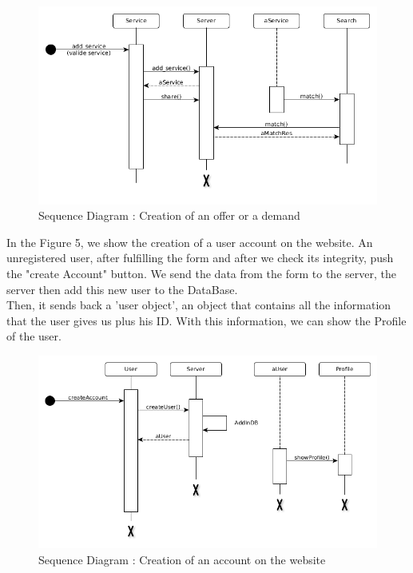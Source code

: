 \begin{figure}[!ht]
	\begin{center}
		\includegraphics[width=\textwidth]{seq_addService.png}
		\caption{Sequence Diagram : Creation of an offer or a demand}
		\label{fig:addService}
	\end{center}
\end{figure}

\newpage
In the Figure 5, we show the creation of a user account on the website. An unregistered user, after fulfilling the form and after we check its integrity, push the "create Account" button. We send the data from the form to the server, the server then add this new user to the DataBase. 
\\ Then, it sends back a 'user object', an object that contains all the information that the user gives us plus his ID. With this information, we can show the Profile of the user.

\begin{figure}[!ht]
	\begin{center}
		\includegraphics[width=\textwidth]{seq_createUser.png}
		\caption{Sequence Diagram : Creation of an account on the website}
		\label{fig:createUser}
	\end{center}
\end{figure}

